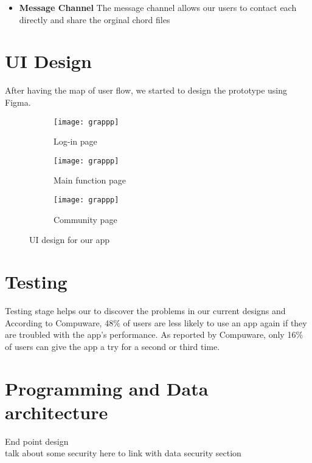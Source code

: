 \begin{itemize}
\item \textbf{Message Channel}
The message channel allows our users to contact each directly and share the orginal chord files 

\end{itemize}




\section{UI Design}
After having the map of user flow, we started to design the prototype using Figma.

\begin{figure}[ht]
     \centering
     \hspace{16mm}
     \begin{subfigure}[b]{0.2\textwidth}
         \centering
         \texttt{[image: grappp]}
         \caption{Log-in page}
         \label{Log-in page}
     \end{subfigure}
     \hfill
     \begin{subfigure}[b]{0.2\textwidth}
         \centering
         \texttt{[image: grappp]}
         \caption{Main function page}
         \label{Main function page}
     \end{subfigure}
     \hfill
     \begin{subfigure}[b]{0.2\textwidth}
         \centering
         \texttt{[image: grappp]}
         \caption{Community page}
         \label{Community page}
     \end{subfigure}
     \hspace{16mm}
        \caption{UI design for our app}
        \label{fig:three graphs}
\end{figure}

\section{Testing}
Testing stage helps our to discover the problems in our current designs and 
According to Compuware, 48\% of users are less likely to use an app again if they are troubled with the app’s performance.
As reported by Compuware, only 16\% of users can give the app a try for a second or third time. 

\section{Programming and Data architecture}
End point design
\\talk about some security here to link with data security section






